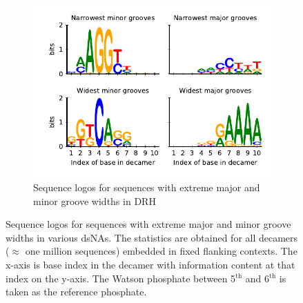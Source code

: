 \begin{figure}
  \begin{subfigure}{15cm}
    \centering\includegraphics[width=10cm]{images/HYB_groove_seq_logo.pdf}
    \centering\caption{Sequence logos for sequences with extreme major and minor groove widths in DRH}
    \end{subfigure}
\centering\caption{Sequence logos for sequences with extreme major and minor groove widths in various dsNAs. The statistics are obtained for all decamers ($\approx$ one million sequences) embedded in fixed flanking contexts. The x-axis is base index in the decamer with information content at that index on the y-axis. The Watson phosphate between 5$^\text{th}$ and 6$^\text{th}$ is taken as the reference phosphate. 
}
\label{c4:fig_groove_logo}
\end{figure}




